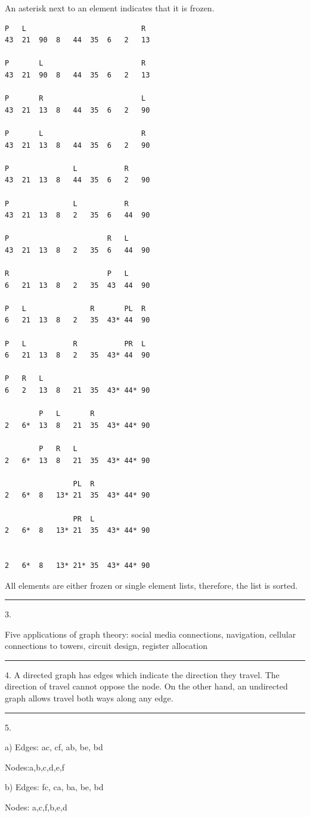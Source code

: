 \documentclass{article}
\begin{document}
An asterisk next to an element indicates that it is frozen. 

\begin{lstlisting}
P 	L 							R
43	21	90	8	44	35	6	2	13

P 		L 						R
43	21	90	8	44	35	6	2	13

P 		R 						L
43	21	13	8	44	35	6	2	90

P 		L 						R
43	21	13	8	44	35	6	2	90

P 		 		L			R	
43	21	13	8	44	35	6	2	90

P 		 		L			R	
43	21	13	8	2	35	6	44	90

P 		 				R	L	
43	21	13	8	2	35	6	44	90

R 		 				P	L	
6	21	13	8	2	35	43	44	90

P	L	 			R		PL	R
6	21	13	8	2	35	43*	44	90

P	L	 		R			PR	L
6	21	13	8	2	35	43*	44	90

P	R	L 						
6	2	13	8	21	35	43*	44*	90

		P 	L		R			
2	6*	13	8	21	35	43*	44*	90

		P 	R	L				
2	6*	13	8	21	35	43*	44*	90

		 		PL	R			
2	6*	8	13*	21	35	43*	44*	90

		 		PR	L			
2	6*	8	13*	21	35	43*	44*	90

		 						
2	6*	8	13*	21*	35	43*	44*	90

\end{lstlisting}

All elements are either frozen or single element lists, therefore, the list is sorted. 

\noindent\rule{8cm}{0.4pt}

3. 

Five applications of graph theory: social media connections, navigation, cellular connections to towers, circuit design, register allocation

\noindent\rule{8cm}{0.4pt}


4. 
A directed graph has edges which indicate the direction they travel. The direction of travel cannot oppose the node. On the other hand, an undirected graph allows travel both ways along any edge. 

\noindent\rule{8cm}{0.4pt}

5. 

a) Edges: ac, cf, ab, be, bd
	
	Nodes:a,b,c,d,e,f

b) Edges: fc, ca, ba, be, bd
	
	Nodes:  a,c,f,b,e,d
\end{document}
